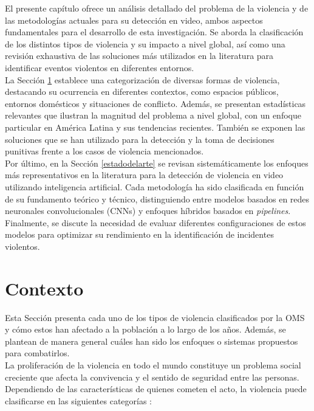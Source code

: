 \label{contexto}
El presente capítulo ofrece un análisis detallado del 
problema de la violencia y de las metodologías actuales 
para su detección en video, ambos aspectos fundamentales 
para el desarrollo de esta investigación. Se aborda la 
clasificación de los distintos tipos de violencia y su 
impacto a nivel global, así como una revisión exhaustiva 
de las soluciones más utilizados en la literatura para 
identificar eventos violentos en diferentes entornos.\\

La Sección \ref{contexto} establece una categorización de 
diversas formas de violencia, destacando su ocurrencia en 
diferentes contextos, como espacios públicos, entornos 
domésticos y situaciones de conflicto. Además, se presentan 
estadísticas relevantes que ilustran la magnitud del problema 
a nivel global, con un enfoque particular en América Latina 
y sus tendencias recientes. También se exponen las soluciones 
que se han utilizado para la detección y la toma de decisiones 
punitivas frente a los casos de violencia mencionados.\\

Por último, en la Sección \ref{estadodelarte} se revisan 
sistemáticamente los enfoques más representativos en la 
literatura para la detección de violencia en video utilizando 
inteligencia artificial. Cada metodología ha sido clasificada 
en función de su fundamento teórico y técnico, distinguiendo 
entre modelos basados en redes neuronales convolucionales 
(CNNs) y enfoques híbridos basados en \textit{pipelines}. 
Finalmente, se discute la necesidad de evaluar diferentes 
configuraciones de estos modelos para optimizar su rendimiento 
en la identificación de incidentes violentos.

\section{Contexto}\label{contexto}
Esta Sección presenta cada uno de los tipos de violencia 
clasificados por la OMS y cómo estos han afectado a la 
población a lo largo de los años. Además, se plantean de 
manera general cuáles han sido los enfoques o sistemas 
propuestos para combatirlos.\\

La proliferación de la violencia en todo el mundo constituye 
un problema social creciente que afecta la convivencia y el 
sentido de seguridad entre las personas. Dependiendo de las 
características de quienes cometen el acto, la violencia 
puede clasificarse en las siguientes categorías \cite{OMS2014}:
 
